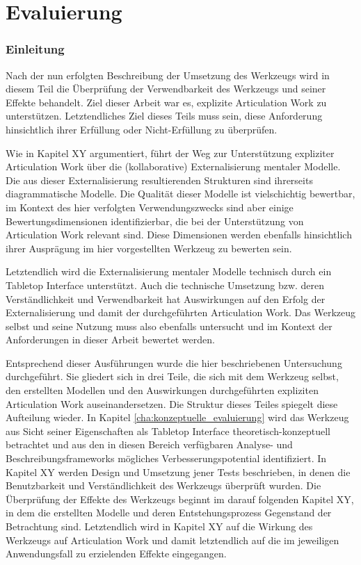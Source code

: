 \part{Evaluierung} %
\label{prt:evaluierung}

\section*{Einleitung} %
\label{sec:evaluierung_einleitung}
\thispagestyle{empty}

Nach der nun erfolgten Beschreibung der Umsetzung des Werkzeugs wird in diesem Teil die Überprüfung der Verwendbarkeit des Werkzeugs und seiner Effekte behandelt. Ziel dieser Arbeit war es, explizite Articulation Work zu unterstützen. Letztendliches Ziel dieses Teils muss sein, diese Anforderung hinsichtlich ihrer Erfüllung oder Nicht-Erfüllung zu überprüfen. 

Wie in Kapitel XY argumentiert, führt der Weg zur Unterstützung expliziter Articulation Work über die (kollaborative) Externalisierung mentaler Modelle. Die aus dieser Externalisierung resultierenden Strukturen sind ihrerseits diagrammatische Modelle. Die Qualität dieser Modelle ist vielschichtig bewertbar, im Kontext des hier verfolgten Verwendungszwecks sind aber einige Bewertungsdimensionen identifizierbar, die bei der Unterstützung von Articulation Work relevant sind. Diese Dimensionen werden ebenfalls hinsichtlich ihrer Ausprägung im hier vorgestellten Werkzeug zu bewerten sein. 

Letztendlich wird die Externalisierung mentaler Modelle technisch durch ein Tabletop Interface unterstützt. Auch die technische Umsetzung bzw. deren Verständlichkeit und Verwendbarkeit hat Auswirkungen auf den Erfolg der Externalisierung und damit der durchgeführten Articulation Work. Das Werkzeug selbst und seine Nutzung muss also ebenfalls untersucht und im Kontext der Anforderungen in dieser Arbeit bewertet werden. 

Entsprechend dieser Ausführungen wurde die hier beschriebenen Untersuchung durchgeführt. Sie gliedert sich in drei Teile, die sich mit dem Werkzeug selbst, den erstellten Modellen und den Auswirkungen durchgeführten expliziten Articulation Work auseinandersetzen. Die Struktur dieses Teiles spiegelt diese Aufteilung wieder. In Kapitel \ref{cha:konzeptuelle_evaluierung} wird das Werkzeug aus Sicht seiner Eigenschaften als Tabletop Interface theoretisch-konzeptuell betrachtet und aus den in diesen Bereich verfügbaren Analyse- und Beschreibungsframeworks mögliches Verbesserungspotential identifiziert. In Kapitel XY werden Design und Umsetzung jener Tests beschrieben, in denen die Benutzbarkeit und Verständlichkeit des Werkzeugs überprüft wurden. Die Überprüfung der Effekte des Werkzeugs beginnt im darauf folgenden Kapitel XY, in dem die erstellten Modelle und deren Entstehungsprozess Gegenstand der Betrachtung sind. Letztendlich wird in Kapitel XY auf die Wirkung des Werkzeugs auf Articulation Work und damit letztendlich auf die im jeweiligen Anwendungsfall zu erzielenden Effekte eingegangen.










%
%

